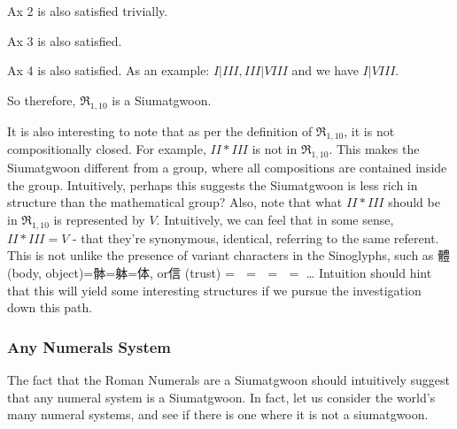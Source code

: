 Ax 2 is also satisfied trivially.

Ax 3 is also satisfied. 

Ax 4 is also satisfied. As an example: $I | III, III | VIII$ and we have $I|VIII$.

So therefore, $\mathfrak{R}_{1,10}$ is a Siumatgwoon. 

It is also interesting to note that as per the definition of $\mathfrak{R}_{1,10}$, it is not compositionally closed. For example, $II * III$ is not in $\mathfrak{R}_{1,10}$. This makes the Siumatgwoon different from a group, where all compositions are contained inside the group. Intuitively, perhaps this suggests the Siumatgwoon is less rich in structure than the mathematical group? Also, note that what $II * III$ should be in $\mathfrak{R}_{1,10}$ is represented by $V$. Intuitively, we can feel that in some sense, $II * III = V$ - that they're synonymous, identical, referring to the same referent. This is not unlike the presence of variant characters in the Sinoglyphs, such as 體 (body, object)=骵=躰=体, or信 (trust) = 𬢭 = 伩 = 訫 = 㐰… Intuition should hint that this will yield some interesting structures if we pursue the investigation down this path.

\subsubsection{Any Numerals System}

The fact that the Roman Numerals are a Siumatgwoon should intuitively suggest that any numeral system is a Siumatgwoon. In fact, let us consider the world's many numeral systems, and see if there is one where it is not a siumatgwoon. 

